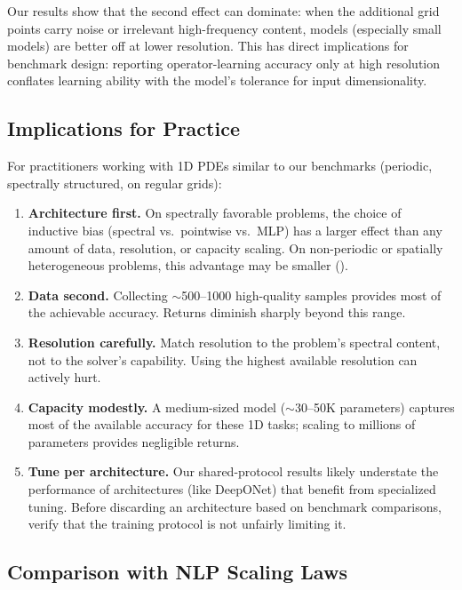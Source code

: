 \documentclass[11pt]{article}
\begin{document}
Our results show that the second effect can dominate: when the
additional grid points carry noise or irrelevant high-frequency
content, models (especially small models) are better off at lower
resolution.
This has direct implications for benchmark design: reporting
operator-learning accuracy only at high resolution conflates learning
ability with the model's tolerance for input dimensionality.

\subsection{Implications for Practice}

For practitioners working with 1D PDEs similar to our benchmarks
(periodic, spectrally structured, on regular grids):
\begin{enumerate}[leftmargin=*,itemsep=2pt]
  \item \textbf{Architecture first.} On spectrally favorable problems,
    the choice of inductive bias (spectral vs.\ pointwise vs.\ MLP)
    has a larger effect than any amount of data, resolution, or
    capacity scaling. On non-periodic or spatially heterogeneous
    problems, this advantage may be smaller ().
  \item \textbf{Data second.} Collecting $\sim$500--1000 high-quality
    samples provides most of the achievable accuracy. Returns diminish
    sharply beyond this range.
  \item \textbf{Resolution carefully.} Match resolution to the problem's
    spectral content, not to the solver's capability. Using the
    highest available resolution can actively hurt.
  \item \textbf{Capacity modestly.} A medium-sized model ($\sim$30--50K
    parameters) captures most of the available accuracy for these 1D
    tasks; scaling to millions of parameters provides negligible
    returns.
  \item \textbf{Tune per architecture.} Our shared-protocol results
    likely understate the performance of architectures (like DeepONet)
    that benefit from specialized tuning. Before discarding an
    architecture based on benchmark comparisons, verify that the
    training protocol is not unfairly limiting it.
\end{enumerate}

\subsection{Comparison with NLP Scaling Laws}
\label{sec:nlp-comparison}
\end{document}
